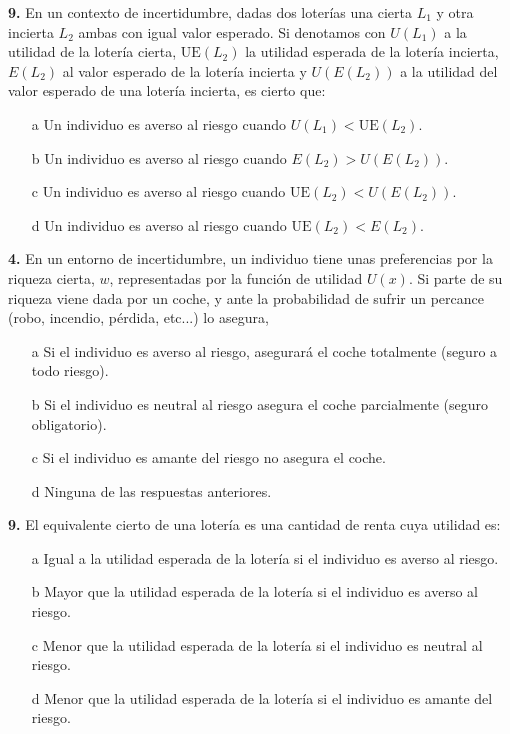 \documentclass{nuevotema}
\begin{document}

\textbf{9.} En un contexto de incertidumbre, dadas dos loterías una cierta $L_1$ y otra incierta $L_2$ ambas con igual valor esperado. Si denotamos con $U(L_1)$ a la utilidad de la lotería cierta, $\text{UE}(L_2)$ la utilidad esperada de la lotería incierta, $E(L_2)$ al valor esperado de la lotería incierta y $U(E(L_2))$ a la utilidad del valor esperado de una lotería incierta, es cierto que:

\begin{enumerate}
	\item[a] Un individuo es averso al riesgo cuando $U(L_1) < \text{UE} (L_2)$.
	\item[b] Un individuo es averso al riesgo cuando $E(L_2) > U(E(L_2))$.
	\item[c] Un individuo es averso al riesgo cuando $\text{UE}(L_2) < U(E(L_2))$.
	\item[d] Un individuo es averso al riesgo cuando $\text{UE}(L_2) < E(L_2)$.
\end{enumerate}


\textbf{4.} En un entorno de incertidumbre, un individuo tiene unas preferencias por la riqueza cierta, $w$, representadas por la función de utilidad $U(x)$. Si parte de su riqueza viene dada por un coche, y ante la probabilidad de sufrir un percance (robo, incendio, pérdida, etc...) lo asegura,

\begin{enumerate}
	\item[a] Si el individuo es averso al riesgo, asegurará el coche totalmente (seguro a todo riesgo).
	\item[b] Si el individuo es neutral al riesgo asegura el coche parcialmente (seguro obligatorio).
	\item[c] Si el individuo es amante del riesgo no asegura el coche.
	\item[d] Ninguna de las respuestas anteriores.
\end{enumerate}



\textbf{9.} El equivalente cierto de una lotería es una cantidad de renta cuya utilidad es:

\begin{enumerate}
	\item[a] Igual a la utilidad esperada de la lotería si el individuo es averso al riesgo.
	\item[b] Mayor que la utilidad esperada de la lotería si el individuo es averso al riesgo.
	\item[c] Menor que la utilidad esperada de la lotería si el individuo es neutral al riesgo.
	\item[d] Menor que la utilidad esperada de la lotería si el individuo es amante del riesgo.
\end{enumerate}
\end{document}
